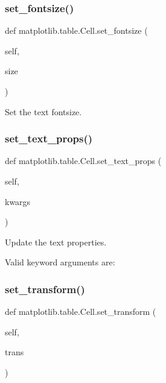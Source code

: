 \subsubsection{\texorpdfstring{set\+\_\+fontsize()}{set\_fontsize()}}
{\footnotesize\ttfamily def matplotlib.\+table.\+Cell.\+set\+\_\+fontsize (\begin{DoxyParamCaption}\item[{}]{self,  }\item[{}]{size }\end{DoxyParamCaption})}

\begin{DoxyVerb}Set the text fontsize.\end{DoxyVerb}
 \mbox{\label{classmatplotlib_1_1table_1_1Cell_acc6fd338f2850837c6091d5827ee3c94}} 
\subsubsection{\texorpdfstring{set\+\_\+text\+\_\+props()}{set\_text\_props()}}
{\footnotesize\ttfamily def matplotlib.\+table.\+Cell.\+set\+\_\+text\+\_\+props (\begin{DoxyParamCaption}\item[{}]{self,  }\item[{}]{kwargs }\end{DoxyParamCaption})}

\begin{DoxyVerb}Update the text properties.

Valid keyword arguments are:

\end{DoxyVerb}
 \mbox{\label{classmatplotlib_1_1table_1_1Cell_aff269ae393e8fdc54357943ec13fda1d}} 
\subsubsection{\texorpdfstring{set\+\_\+transform()}{set\_transform()}}
{\footnotesize\ttfamily def matplotlib.\+table.\+Cell.\+set\+\_\+transform (\begin{DoxyParamCaption}\item[{}]{self,  }\item[{}]{trans }\end{DoxyParamCaption})}

